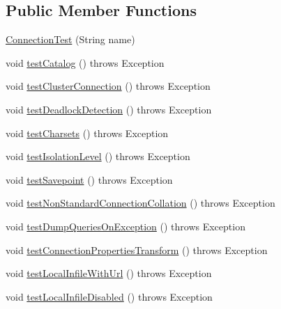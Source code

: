 \subsection*{Public Member Functions}
\begin{DoxyCompactItemize}
\item 
\mbox{\hyperlink{classtestsuite_1_1simple_1_1_connection_test_acee3750bd5fb78ce7006ff31f5740a48}{Connection\+Test}} (String name)
\item 
void \mbox{\hyperlink{classtestsuite_1_1simple_1_1_connection_test_a272c1a4280b551be2feb88f3995878b0}{test\+Catalog}} ()  throws Exception 
\item 
void \mbox{\hyperlink{classtestsuite_1_1simple_1_1_connection_test_a898cfadb7bf3141e3a364a0d47c824fc}{test\+Cluster\+Connection}} ()  throws Exception 
\item 
void \mbox{\hyperlink{classtestsuite_1_1simple_1_1_connection_test_afeddb6540162d5a3efe572d521dcc051}{test\+Deadlock\+Detection}} ()  throws Exception 
\item 
void \mbox{\hyperlink{classtestsuite_1_1simple_1_1_connection_test_a50e876f57ca8519b368cead6c0dbf840}{test\+Charsets}} ()  throws Exception 
\item 
void \mbox{\hyperlink{classtestsuite_1_1simple_1_1_connection_test_a021e6d2e50117ac6af546f9f340e2127}{test\+Isolation\+Level}} ()  throws Exception 
\item 
void \mbox{\hyperlink{classtestsuite_1_1simple_1_1_connection_test_a999284ad25ed2dab4c2caa40dd551b51}{test\+Savepoint}} ()  throws Exception 
\item 
void \mbox{\hyperlink{classtestsuite_1_1simple_1_1_connection_test_a8965be404ac9488d5926ecd89eaeb919}{test\+Non\+Standard\+Connection\+Collation}} ()  throws Exception 
\item 
void \mbox{\hyperlink{classtestsuite_1_1simple_1_1_connection_test_aa872b5f5448e7c9bfdcdc0db0efccda4}{test\+Dump\+Queries\+On\+Exception}} ()  throws Exception 
\item 
void \mbox{\hyperlink{classtestsuite_1_1simple_1_1_connection_test_a77b859fa3de7562ca295047776f563ee}{test\+Connection\+Properties\+Transform}} ()  throws Exception 
\item 
void \mbox{\hyperlink{classtestsuite_1_1simple_1_1_connection_test_aeb62fe06a5c144213319846e29ad17f5}{test\+Local\+Infile\+With\+Url}} ()  throws Exception 
\item 
void \mbox{\hyperlink{classtestsuite_1_1simple_1_1_connection_test_ae0b70d037f67120f9758b18cea34e4b3}{test\+Local\+Infile\+Disabled}} ()  throws Exception 

\end{DoxyCompactItemize}
